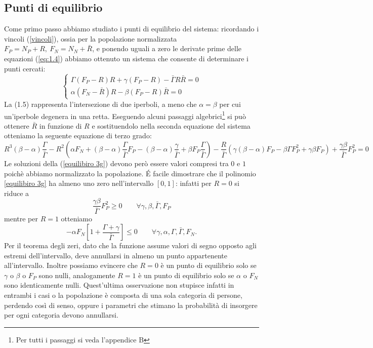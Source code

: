 \subsection{Punti di equilibrio}
Come primo passo abbiamo studiato i punti di equilibrio del sistema: ricordando i vincoli (\ref{vincoli}), ossia per la popolazione normalizzata $
	F_{P}=N_{P}+R ,\ F_{N}=N_{N}+\bar{R}
$, e ponendo uguali a zero le derivate prime delle equazioni (\ref{eq:1.4}) abbiamo ottenuto un sistema che consente di determinare i punti cercati:
\begin{equation}
	\begin{cases}
		\Gamma (F_{P}-R)R+\gamma (F_{P}-R)-\bar{\Gamma}R\bar{R}=0\\
		\alpha (F_{N}-\bar{R})R-\beta (F_{P}-R)\bar{R}=0
	\end{cases}
\end{equation}La (1.5) rappresenta l'intersezione di due iperboli, a meno che $\alpha=\beta$ per cui un'iperbole degenera in una retta.
Eseguendo alcuni passaggi algebrici\footnote{Per tutti i passaggi si veda l'appendice B} si può ottenere $ \bar{R} $ in funzione di $ R $ e sostituendolo nella seconda equazione del sistema otteniamo la seguente equazione di terzo grado:
\begin{equation}
	R^{3}(\beta - \alpha)\frac{\Gamma}{\bar{\Gamma}}-R^{2}\left(\alpha F_{N}+(\beta - \alpha)\frac{\Gamma}{\bar{\Gamma}}F_{P}-(\beta - \alpha)\frac{\gamma}{\bar{\Gamma}}+\beta F_{P}\frac{\Gamma}{\bar{\Gamma}}\right)-\frac{R}{\bar{\Gamma}}\left(\gamma (\beta - \alpha)F_{P}-\beta \Gamma F^{2}_{P}+\gamma\beta F_{P}\right)+\frac{\gamma\beta}{\bar{\Gamma}}F^{2}_{P}
	\label{equilibiro 3g}=0
\end{equation}
Le soluzioni della (\ref{equilibiro 3g}) devono però essere valori compresi tra $0$ e $1$ poichè abbiamo normalizzato la popolazione. \'{E} facile dimostrare che il polinomio \ref{equilibiro 3g} ha almeno uno zero nell'intervallo $ \left[0,1\right] $: infatti per $ R=0 $ si riduce a
\begin{equation}
	\frac{\gamma\beta}{\bar{\Gamma}}F^{2}_{P}\geq0\qquad \forall \gamma, \beta, \bar{\Gamma}, F_{P}
\end{equation}
mentre per $ R=1 $ otteniamo
\begin{equation}
	-\alpha F_{N}\left[1+\frac{\Gamma+ \gamma}{\bar{\Gamma}}\right]\leq0\qquad \forall \gamma, \alpha, \Gamma, \bar{\Gamma}, F_{N}.
\end{equation}
Per il teorema degli zeri, dato che la funzione assume valori di segno opposto agli estremi dell'intervallo, deve annullarsi in almeno un punto appartenente all'intervallo. Inoltre possiamo evincere che $R=0$ è un punto di equilibrio solo se $\gamma$ o $\beta$ o $F_P$ sono nulli, analogamente $R=1$ è un punto di equilibrio solo se $\alpha$ o $F_N$ sono identicamente nulli. Quest'ultima osservazione non stupisce infatti in entrambi i casi o la popolazione è composta di una sola categoria di persone, perdendo così di senso, oppure i parametri che stimano la probabilità di insorgere per ogni categoria devono annullarsi.

